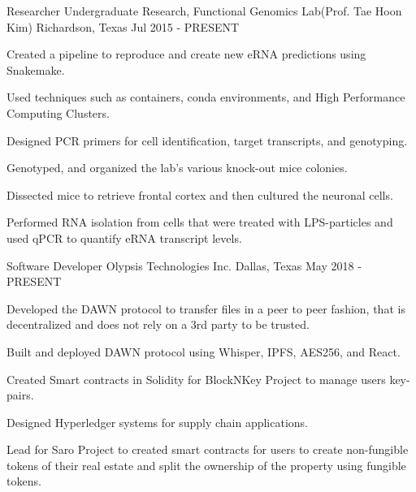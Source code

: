 

\begin{cventries}

	\cventry
	{Researcher} %
	{Undergraduate Research, Functional Genomics Lab(Prof. Tae Hoon Kim)} %
	{Richardson, Texas} %
	{Jul 2015 - PRESENT} %
	{
		\begin{cvitems} %
			\item {Created a pipeline to reproduce and create new eRNA
			            predictions using Snakemake.}
			\item {Used techniques such as containers, conda environments, and High
			            Performance Computing Clusters.}
			\item {Designed PCR primers for cell identification, target transcripts, and genotyping.}
			\item {Genotyped, and organized the lab's various knock-out mice colonies.}
			\item {Dissected mice to retrieve frontal cortex and then cultured the neuronal cells.}
			\item {Performed RNA isolation from cells that were treated with LPS-particles and used qPCR to quantify eRNA transcript levels.}
		\end{cvitems}
	}

	\cventry
	{Software Developer} %
	{Olypsis Technologies Inc.} %
	{Dallas, Texas} %
	{May 2018 - PRESENT} %
	{
		\begin{cvitems} %
			\item {Developed the DAWN protocol to transfer files in a peer to peer fashion, that is decentralized and does not rely on a 3rd party to be trusted.}
			\item {Built and deployed DAWN protocol using Whisper, IPFS, AES256, and React.}
			\item {Created Smart contracts in Solidity for BlockNKey Project to manage users key-pairs.}
			\item {Designed Hyperledger systems for supply chain applications.}
			\item {Lead for Saro Project to created smart contracts for users to create non-fungible tokens of their real estate and split the ownership of the property using fungible tokens.}
		\end{cvitems}
	}


\end{cventries}
